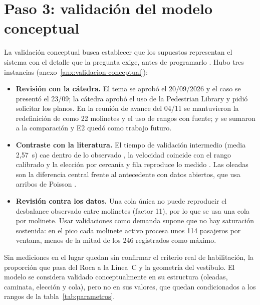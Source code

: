\section{Paso 3: validación del modelo conceptual}
\label{sec:paso3-validacion-conceptual}

La validación conceptual busca establecer que los supuestos representan el sistema con el detalle que la
pregunta exige, antes de programarlo \parencite{law2015}. Hubo tres instancias (anexo~\ref{anx:validacion-conceptual}):
\begin{itemize}
  \item \textbf{Revisión con la cátedra.} El tema se aprobó el 20/09/2026 y el caso se presentó el 23/09; la
        cátedra aprobó el uso de la Pedestrian Library y pidió solicitar los planos. En la reunión de avance del
        04/11 se mantuvieron la redefinición de \EI{} como 22 molinetes y el uso de rangos con fuente; \ET{} y
        \EIT{} se sumaron a la comparación y E2 quedó como trabajo futuro.
  \item \textbf{Contraste con la literatura.} El tiempo de validación intermedio (media 2,57~s) cae dentro de lo
        observado \parencite{seriani2025,wang2024}, la velocidad coincide con el rango calibrado
        \parencite{li2024} y la elección por cercanía y fila reproduce lo medido
        \parencite{seriani2025,tian2026,wang2024}. Las oleadas son la diferencia central frente al antecedente
        con datos abiertos, que usa arribos de Poisson \parencite{zhen2024}.
  \item \textbf{Revisión contra los datos.} Una cola única no puede reproducir el desbalance observado entre
        molinetes (factor 11), por lo que se usa una cola por molinete. Usar validaciones como demanda supone que
        no hay saturación sostenida: en el pico cada molinete activo procesa unos 114 pasajeros por ventana,
        menos de la mitad de los 246 registrados como máximo.
\end{itemize}
Sin mediciones en el lugar quedan sin confirmar el criterio real de habilitación, la proporción que pasa del
Roca a la Línea~C y la geometría del vestíbulo. El modelo se considera validado conceptualmente en su estructura
(oleadas, caminata, elección y cola), pero no en sus valores, que quedan condicionados a los rangos de la
tabla~\ref{tab:parametros}.
